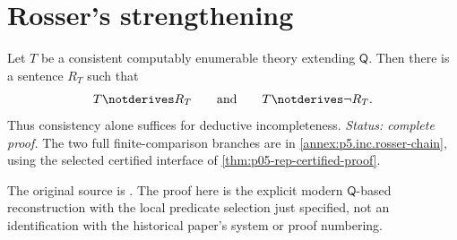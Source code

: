 \section{Rosser's strengthening}
\label{sec:first-incompleteness-04}

\begin{theorem}[Rosser]
\label{thm:rosser}
Let \(T\) be a consistent computably enumerable theory extending \(\mathsf Q\).
Then there is
a sentence \(R_T\) such that
\[
  T\notderives R_T
  \qquad\text{and}\qquad
  T\notderives\neg R_T.
\]
Thus consistency alone suffices for deductive incompleteness.
\textit{Status: complete proof.}  The two full finite-comparison
branches are in \cref{annex:p5.inc.rosser-chain}, using the selected
certified interface of \cref{thm:p05-rep-certified-proof}.
\end{theorem}

The original source is \cite{Rosser1936}.  The proof here is the
explicit modern \(\mathsf Q\)-based reconstruction with the local
predicate selection just specified, not an identification with the
historical paper's system or proof numbering.

